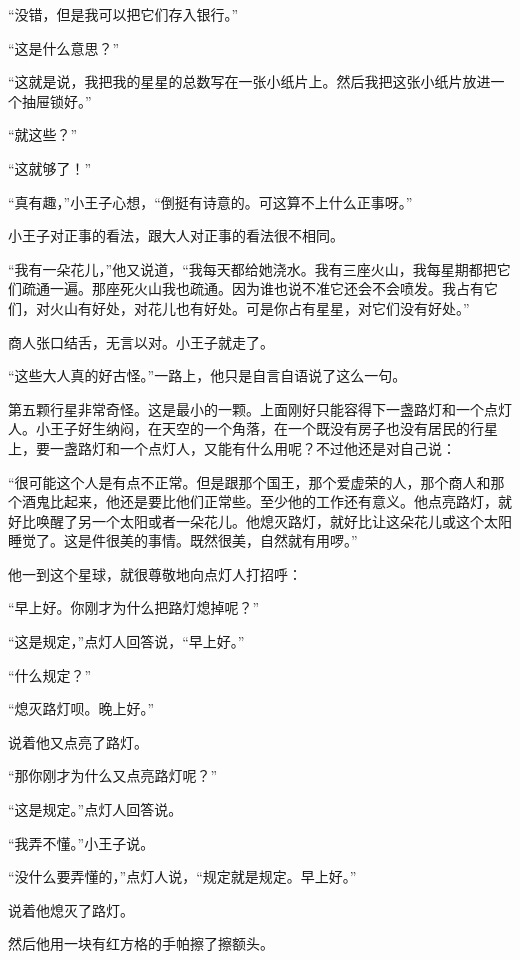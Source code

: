 “没错，但是我可以把它们存入银行。”

“这是什么意思？”

“这就是说，我把我的星星的总数写在一张小纸片上。然后我把这张小纸片放进一个抽屉锁好。”

“就这些？”

“这就够了！”

“真有趣，”小王子心想，“倒挺有诗意的。可这算不上什么正事呀。”

小王子对正事的看法，跟大人对正事的看法很不相同。

“我有一朵花儿，”他又说道，“我每天都给她浇水。我有三座火山，我每星期都把它们疏通一遍。那座死火山我也疏通。因为谁也说不准它还会不会喷发。我占有它们，对火山有好处，对花儿也有好处。可是你占有星星，对它们没有好处。”

商人张口结舌，无言以对。小王子就走了。

“这些大人真的好古怪。”一路上，他只是自言自语说了这么一句。


\stoptitle

\starttitle[title={14},reference={part0016.html_a017}]

第五颗行星非常奇怪。这是最小的一颗。上面刚好只能容得下一盏路灯和一个点灯人。小王子好生纳闷，在天空的一个角落，在一个既没有房子也没有居民的行星上，要一盏路灯和一个点灯人，又能有什么用呢？不过他还是对自己说：

“很可能这个人是有点不正常。但是跟那个国王，那个爱虚荣的人，那个商人和那个酒鬼比起来，他还是要比他们正常些。至少他的工作还有意义。他点亮路灯，就好比唤醒了另一个太阳或者一朵花儿。他熄灭路灯，就好比让这朵花儿或这个太阳睡觉了。这是件很美的事情。既然很美，自然就有用啰。”

他一到这个星球，就很尊敬地向点灯人打招呼：

“早上好。你刚才为什么把路灯熄掉呢？”

“这是规定，”点灯人回答说，“早上好。”

“什么规定？”

“熄灭路灯呗。晚上好。”

说着他又点亮了路灯。

“那你刚才为什么又点亮路灯呢？”

“这是规定。”点灯人回答说。

“我弄不懂。”小王子说。

“没什么要弄懂的，”点灯人说，“规定就是规定。早上好。”

说着他熄灭了路灯。

然后他用一块有红方格的手帕擦了擦额头。

